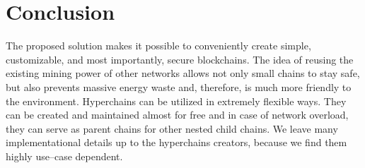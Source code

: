\section{Conclusion}

The proposed solution makes it possible to conveniently create simple, customizable, and most
importantly, secure blockchains. The idea of reusing the existing mining power
of other networks allows not only small chains to stay safe, but also
prevents massive energy waste and, therefore, is much more friendly to the environment.
Hyperchains can be utilized in extremely flexible ways. They can be created and
maintained almost for free and in case of network overload, they can serve as
parent chains for other nested child chains. We leave many implementational
details up to the hyperchains creators, because we find them highly
use–case dependent.
